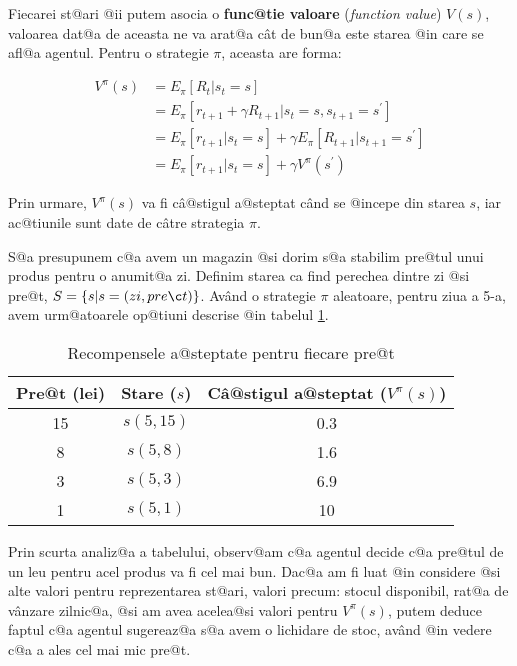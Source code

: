 Fiecarei st@ari @ii putem asocia o \textbf{func@tie valoare} (\textsl{function value}) $V(s)$, valoarea dat@a de aceasta ne va arat@a c\^ at de bun@a este starea @in care se afl@a agentul. Pentru o strategie $\pi$, aceasta are forma:


\begin{align}
	V^{\pi}(s) & =   E_{\pi} \left[ R_t | s_t = s \right] \\
	& =  E_{\pi} \left[ r_{t+1} + \gamma R_{t+1} | s_t = s, s_{t+1} = s^{\prime} \right] \\
	& =   E_{\pi} \left[ r_{t+1}| s_t = s \right] + \gamma E_{\pi} \left[  R_{t+1} | s_{t+1} = s^{\prime} \right] \\
	& =  E_{\pi} \left[ r_{t+1}| s_t = s \right] + \gamma V^{\pi}(s^{\prime})
\end{align}

\noindent Prin urmare, $V^{\pi}(s)$ va fi c\^ a@stigul a@steptat c\^ and se @incepe din starea $s$, iar ac@tiunile sunt date de c\^atre strategia $\pi$.

S@a presupunem c@a avem un magazin @si dorim s@a stabilim pre@tul unui produs pentru o anumit@a zi. Definim starea ca find perechea dintre zi @si pre@t, $S = \left\lbrace  s | s = (zi, pre\c t) \right\rbrace$. Av\^ and o strategie $\pi$ aleatoare, pentru ziua a 5-a, avem urm@atoarele op@tiuni descrise @in tabelul \ref{tab:pret-magazin}.

\begin{table}[h]
	\begin{center}
		\begin{tabular}{|c|c|c|}
			\hline
			Pre@t (lei) & Stare ($s$) & C\^ a@stigul a@steptat ($V^{\pi}(s)$) \\
			\hline
			15 & $s(5,15)$ & 0.3 \\
			\hline
			8 & $s(5,8)$ & 1.6 \\
			\hline
			3 & $s(5,3)$ & 6.9 \\
			\hline
			1 & $s(5,1)$ & 10 \\ 
			\hline
		\end{tabular}
	\end{center}
	\caption{Recompensele a@steptate pentru fiecare pre@t}
	\label{tab:pret-magazin}
\end{table}

Prin scurta analiz@a a tabelului, observ@am c@a agentul decide c@a pre@tul de un leu pentru acel produs va fi cel mai bun. Dac@a am fi luat @in considere @si alte valori pentru reprezentarea st@ari, valori precum: stocul disponibil, rat@a de v\^ anzare zilnic@a, @si am avea acelea@si valori pentru $V^{\pi}(s)$, putem deduce faptul c@a agentul sugereaz@a s@a avem o lichidare de stoc, av\^and @in vedere c@a a ales cel mai mic pre@t.

